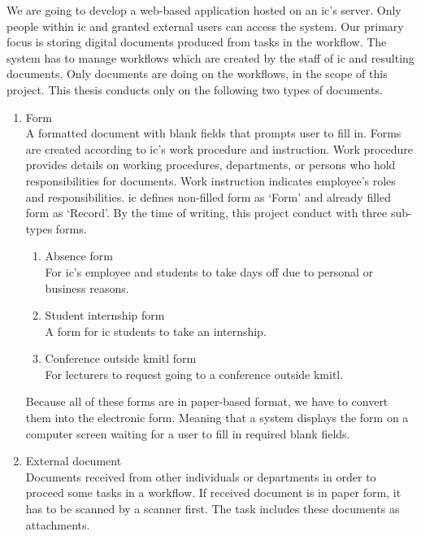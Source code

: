 We are going to develop a web-based application hosted on an \gls{ic}'s server.
Only people within \gls{ic} and granted external users can access the system.
Our primary focus is storing digital documents produced from tasks in the workflow.
The system has to manage workflows which are created by the staff of \gls{ic} and resulting documents.
Only documents are doing on the workflows, in the scope of this project.
This thesis conducts only on the following two types of documents.
\begin{enumerate}
\item Form \hfill \\
A formatted document with blank fields that prompts user to fill in.
Forms are created according to \gls{ic}'s work procedure and instruction.
Work procedure provides details on working procedures, departments, or persons who hold responsibilities for documents.
Work instruction indicates employee's roles and responsibilities.
\gls{ic} defines non-filled form as \enquote*{Form} and already filled form as \enquote*{Record}.
By the time of writing, this project conduct with three sub-types forms.
\begin{enumerate}
\item Absence form \hfill \\
For \gls{ic}'s employee and students to take days off due to personal or business reasons.
\item Student internship form \hfill \\
A form for \gls{ic} students to take an internship.
\item Conference outside \gls{kmitl} form \hfill \\
For lecturers to request going to a conference outside \gls{kmitl}.
\end{enumerate}
Because all of these forms are in paper-based format, we have to convert them into the electronic form.
Meaning that a system displays the form on a computer screen waiting for a user to fill in required blank fields.
\item External document \hfill \\
Documents received from other individuals or departments in order to proceed some tasks in a workflow.
If received document is in paper form, it has to be scanned by a scanner first.
The task includes these documents as attachments.
\end{enumerate}